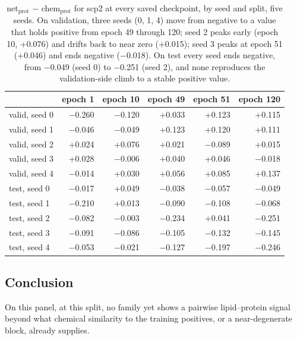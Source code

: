 \begin{table}[htbp]
\centering
\begin{tabular}{lrrrrr}
\hline
& epoch 1 & epoch 10 & epoch 49 & epoch 51 & epoch 120 \\
\hline
valid, seed 0 & $-$0.260 & $-$0.120 & +0.033 & +0.123 & +0.115 \\
valid, seed 1 & $-$0.046 & $-$0.049 & +0.123 & +0.120 & +0.111 \\
valid, seed 2 & +0.024 & +0.076 & +0.021 & $-$0.089 & +0.015 \\
valid, seed 3 & +0.028 & $-$0.006 & +0.040 & +0.046 & $-$0.018 \\
valid, seed 4 & $-$0.014 & +0.030 & +0.056 & +0.085 & +0.137 \\
test, seed 0 & $-$0.017 & +0.049 & $-$0.038 & $-$0.057 & $-$0.049 \\
test, seed 1 & $-$0.210 & +0.013 & $-$0.090 & $-$0.108 & $-$0.068 \\
test, seed 2 & $-$0.082 & $-$0.003 & $-$0.234 & +0.041 & $-$0.251 \\
test, seed 3 & $-$0.091 & $-$0.086 & $-$0.105 & $-$0.132 & $-$0.145 \\
test, seed 4 & $-$0.053 & $-$0.021 & $-$0.127 & $-$0.197 & $-$0.246 \\
\hline
\end{tabular}
\caption{net$_{\text{prot}}$ $-$ chem$_{\text{prot}}$ for scp2 at every saved checkpoint,
by seed and split, five seeds. On validation, three seeds (0, 1, 4) move from negative
to a value that holds positive from epoch 49 through 120; seed 2 peaks early (epoch 10,
+0.076) and drifts back to near zero (+0.015); seed 3 peaks at epoch 51 (+0.046) and
ends negative ($-$0.018). On test every seed ends negative, from $-$0.049 (seed 0) to
$-$0.251 (seed 2), and none reproduces the validation-side climb to a stable positive
value.}
\label{tab:scp2epochs}
\end{table}

\subsection{Conclusion}

On this panel, at this split, no family yet shows a pairwise lipid--protein signal
beyond what chemical similarity to the training positives, or a near-degenerate block,
already supplies.
